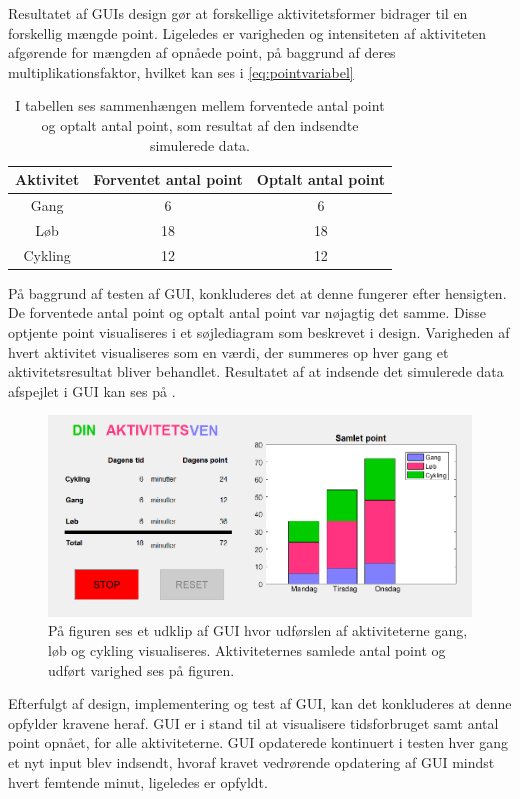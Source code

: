 Resultatet af GUIs design gør at forskellige aktivitetsformer bidrager til en forskellig mængde point. Ligeledes er varigheden og intensiteten  af aktiviteten afgørende for mængden af opnåede point, på baggrund af deres multiplikationsfaktor, hvilket kan ses i \eqref{eq:pointvariabel}
\begin{table}[H]
	\centering
	\begin{tabular}{ccc}
		\hline
		\rowcolor[HTML]{C0C0C0} 
		Aktivitet 	& Forventet antal point & Optalt antal point \\ \hline
		Gang 	&  6 & 6  \\ \hline
		Løb 	& 18 & 18 \\ \hline
		Cykling & 12 & 12 \\ \hline
	\end{tabular}
	\caption{I tabellen ses sammenhængen mellem forventede antal point og optalt antal point, som resultat af den indsendte simulerede data.}
	\label{test:GUI}
\end{table}\vspace{-.5cm}
På baggrund af testen af GUI, konkluderes det at denne fungerer efter hensigten. De forventede antal point og optalt antal point var nøjagtig det samme. Disse optjente point visualiseres i et søjlediagram som beskrevet i design. Varigheden af hvert aktivitet visualiseres som en værdi, der summeres op hver gang et aktivitetsresultat bliver behandlet. Resultatet af at indsende det simulerede data afspejlet i GUI kan ses på .

\begin{figure}[H]
	\centering
	\includegraphics[scale=0.7]{figures/cDesign/test_GUI.png}
	\caption{På figuren ses et udklip af GUI hvor udførslen af aktiviteterne gang, løb og cykling visualiseres. Aktiviteternes samlede antal point og udført varighed ses på figuren.}
	\label{fig:GUI2}
\end{figure}

Efterfulgt af design, implementering og test af GUI, kan det konkluderes at denne opfylder kravene heraf. GUI er i stand til at visualisere tidsforbruget samt antal point opnået, for alle aktiviteterne. GUI opdaterede kontinuert i testen hver gang et nyt input blev indsendt, hvoraf kravet vedrørende opdatering af GUI mindst hvert femtende minut, ligeledes er opfyldt.